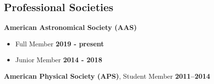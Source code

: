 \documentclass[margin]{res}
\begin{document}
\begin{resume}











\section{Professional Societies}
{\bf American Astronomical Society (AAS)}%
\begin{itemize}\itemsep -2pt
    \item[] Full Member \hfill {\bf 2019 - present}
    \item[] Junior Member \hfill {\bf 2014 - 2018}
\end{itemize} \vspace{-10pt}
{\bf American Physical Society (APS)}, Student Member  \hfill {\bf 2011--2014}





\end{resume}
\end{document}
